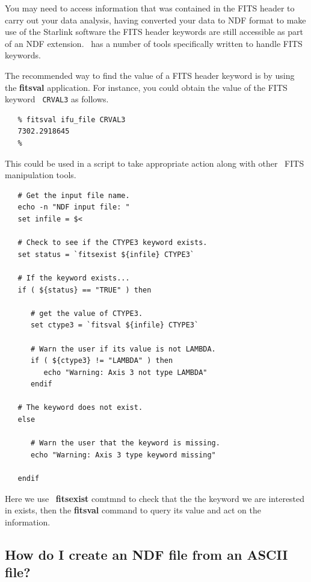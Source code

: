 \documentclass[twoside,11pt]{article}
\newcommand{\htmlref}[2]{#1}
\newcommand{\xref}[3]{#1}
\newcommand{\xlabel}[1]{}
\begin{document}
\begin{\htmlonly}
{You may need to access information that was contained in the FITS
header to carry out your data analysis, having converted your data to
\xref{NDF}{sun33}{} format to make use of the Starlink software the
FITS header keywords are still accessible as part of an NDF extension.
\KAPPAref\ has a number of tools specifically written to handle
\xref{FITS keywords}{sun95}{se_fitsairlock}.

The recommended way to find the value of a FITS header keyword is by
using the \xref{{\bf fitsval}}{sun95}{FITSVAL} application.  For instance, you
could obtain the value of the FITS keyword \htmlref{{\tt
CRVAL3}}{sc16_teifufile} as follows.

\small\begin{verbatim}
   % fitsval ifu_file CRVAL3
   7302.2918645
   %
\end{verbatim}\normalsize

This could be used in a script to take appropriate action along with
other \KAPPA\ \xref{FITS manipulation tools}{sun95}{se_fitsairlock}.

\small\begin{verbatim}
   # Get the input file name.
   echo -n "NDF input file: "
   set infile = $<
   
   # Check to see if the CTYPE3 keyword exists.
   set status = `fitsexist ${infile} CTYPE3`
   
   # If the keyword exists...
   if ( ${status} == "TRUE" ) then
   
      # get the value of CTYPE3.
      set ctype3 = `fitsval ${infile} CTYPE3`

      # Warn the user if its value is not LAMBDA.
      if ( ${ctype3} != "LAMBDA" ) then
         echo "Warning: Axis 3 not type LAMBDA"
      endif
      
   # The keyword does not exist.
   else
   
      # Warn the user that the keyword is missing.
      echo "Warning: Axis 3 type keyword missing"
      
   endif
\end{verbatim}\normalsize

Here we use \KAPPA\ \xref{{\bf fitsexist}}{sun95}{FITSEXIST} comtmnd to check
that the the keyword we are interested in exists, then the
{\bf fitsval} command to query its value and act on
the information.

\subsection{\xlabel{sc16_newndf}How do I create an NDF file from an ASCII file?\label{sc16_newndf}}

}
\end{\htmlonly}
\end{document}
